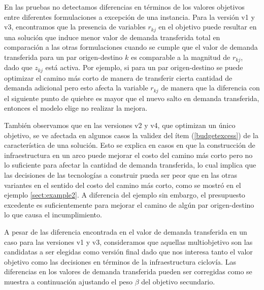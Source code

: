 En las pruebas no detectamos diferencias en términos de los valores objetivos entre diferentes formulaciones a excepción de una instancia. Para la versión v1 y v3, encontramos que la presencia de variables $r_{kj}$ en el objetivo puede resultar en una solución que induce menor valor de demanda transferida total en comparación a las otras formulaciones cuando se cumple que el valor de demanda transferida para un par origen-destino $k$ es comparable a la magnitud de $r_{kj}$, dado que $z_{kj}$ está activa. Por ejemplo, si para un par origen-destino se puede optimizar el camino más corto de manera de transferir cierta cantidad de demanda adicional pero esto afecta la variable $r_{kj}$ de manera que la diferencia con el siguiente punto de quiebre es mayor que el nuevo salto en demanda transferida, entonces el modelo elige no realizar la mejora.

También observamos que en las versiones v2 y v4, que optimizan un único objetivo, se ve afectada en algunos casos la validez del ítem (\ref{budgetexcess}) de la característica de una solución. Esto se explica en casos en que la construcción de infraestructura en un arco puede mejorar el costo del camino más corto pero no lo suficiente para afectar la cantidad de demanda transferida, lo cual implica que las decisiones de las tecnologías a construir pueda ser peor que en las otras variantes en el sentido del costo del camino más corto, como se mostró en el ejemplo \ref{sect:example2}. A diferencia del ejemplo sin embargo, el presupuesto excedente es suficientemente para mejorar el camino de algún par origen-destino lo que causa el incumplimiento.

A pesar de las diferencia encontrada en el valor de demanda transferida en un caso para las versiones v1 y v3, consideramos que aquellas multiobjetivo son las candidatas a ser elegidas como versión final dado que nos interesa tanto el valor objetivo como las decisiones en términos de la infraestructura ciclovía. Las diferencias en los valores de demanda transferida pueden ser corregidas como se muestra a continuación ajustando el peso $\beta$ del objetivo secundario.

